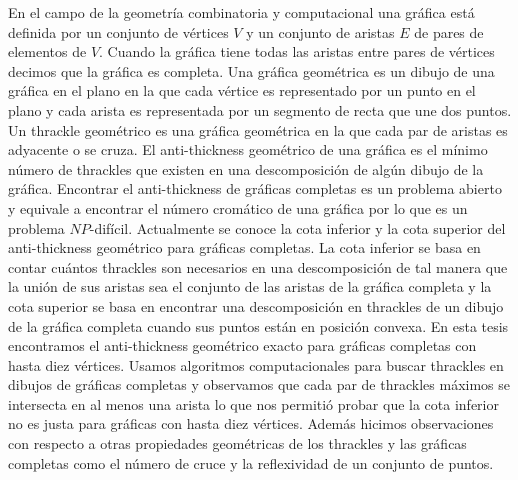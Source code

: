 En el campo de la geometría combinatoria y computacional una gráfica está definida por un conjunto
de vértices $V$ y un conjunto de aristas $E$ de pares de elementos de $V$. Cuando la gráfica tiene
todas las aristas entre pares de vértices decimos que la gráfica es completa. Una gráfica geométrica
es un dibujo de una gráfica en el plano en la que cada vértice es representado por un punto en el
plano y cada arista es representada por un segmento de recta que une dos puntos. Un thrackle
geométrico es una gráfica geométrica en la que cada par de aristas es adyacente o se cruza. El
anti-thickness geométrico de una gráfica es el mínimo número de thrackles que existen en una
descomposición de algún dibujo de la gráfica. Encontrar el anti-thickness de gráficas completas es
un problema abierto y equivale a encontrar el número cromático de una gráfica por lo que es un
problema $NP$-difícil. Actualmente se conoce la cota inferior y la cota superior del anti-thickness
geométrico para gráficas completas. La cota inferior se basa en contar cuántos thrackles son
necesarios en una descomposición de tal manera que la unión de sus aristas sea el conjunto de las
aristas de la gráfica completa y la cota superior se basa en encontrar una descomposición en
thrackles de un dibujo de la gráfica completa cuando sus puntos están en posición convexa. En esta
tesis encontramos el anti-thickness geométrico exacto para gráficas completas con hasta diez
vértices. Usamos algoritmos computacionales para buscar thrackles en dibujos de gráficas completas
y observamos que cada par de thrackles máximos se intersecta en al menos una arista lo que nos
permitió probar que la cota inferior no es justa para gráficas con hasta diez vértices. Además
hicimos observaciones con respecto a otras propiedades geométricas de los thrackles y las
gráficas completas como el número de cruce y la reflexividad de un conjunto de puntos.
